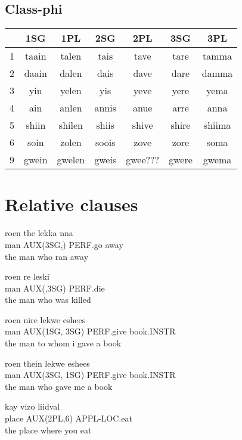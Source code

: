 \documentclass[11pt]{article}
\begin{document}
\subsection{Class-phi}
\begin{center}
	\begin{tabular}{|l|c|c|c|c|c|c|}
	  \hline
      & 1SG & 1PL & 2SG & 2PL & 3SG & 3PL \\ \hline
      1 & taain & talen & tais & tave & tare & tamma  \\ \hline
      2 & daain & dalen & dais & dave & dare & damma \\ \hline
      3 & yin  & yelen & yis & yeve & yere & yema \\ \hline
      4 & ain & anlen & annis & anue & arre & anna \\ \hline
      5 & shiin & shilen & shiis & shive & shire  & shiima\\ \hline
      6 & soin & zolen & soois & zove & zore & soma \\ \hline
      9 & gwein & gwelen & gweis & gwee??? & gwere & gwema\\ \hline
      \end{tabular}
\end{center}

\section{Relative clauses}

\begin{exe}
\ex
\gll roen the lekka nna \\
 man AUX(3SG,) PERF.go away \\
\trans the man who ran away

\ex
\gll roen re leski \\
man AUX(,3SG) PERF.die \\
\trans the man who was killed


\ex
\gll roen nire lekwe eshees \\
man AUX(1SG, 3SG) PERF.give book.INSTR \\
\trans the man to whom i gave a book

\ex
\gll roen thein lekwe eshees \\
man AUX(3SG, 1SG) PERF.give book.INSTR \\
\trans the man who gave me a book

\ex
\gll kay vizo liidval \\
place AUX(2PL,6) APPL-LOC.eat \\
\trans the place where you eat
\end{exe}
\end{document}

